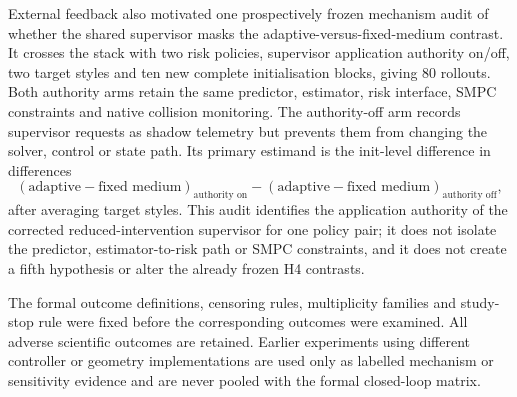 External feedback also motivated one prospectively frozen mechanism audit of
whether the shared supervisor masks the adaptive-versus-fixed-medium contrast.
It crosses the \Bone{} stack with two risk policies, supervisor application
authority on/off, two target styles and ten new complete initialisation blocks,
giving 80 rollouts. Both authority arms retain the same predictor, estimator,
risk interface, SMPC constraints and native collision monitoring. The
authority-off arm records supervisor requests as shadow telemetry but prevents
them from changing the solver, control or state path. Its primary estimand is
the init-level difference in differences
\[
 (\text{adaptive}-\text{fixed medium})_{\text{authority on}}-
 (\text{adaptive}-\text{fixed medium})_{\text{authority off}},
\]
after averaging target styles. This audit identifies the application authority
of the corrected reduced-intervention supervisor for one policy pair; it does
not isolate the predictor, estimator-to-risk path or SMPC constraints, and it
does not create a fifth hypothesis or alter the already frozen H4 contrasts.

The formal outcome definitions, censoring rules, multiplicity families and
study-stop rule were fixed before the corresponding outcomes were examined.
All adverse scientific outcomes are retained. Earlier experiments using
different controller or geometry implementations are used only as labelled
mechanism or sensitivity evidence and are never pooled with the formal
closed-loop matrix.
